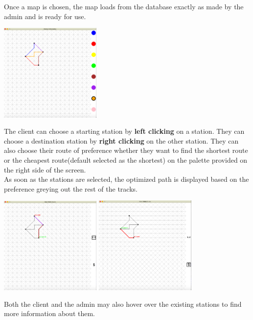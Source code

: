 \documentclass[fontsize=11pt]{article}
\begin{document}
    Once a map is chosen, the map loads from the database exactly as made by the admin and is ready for use.\\
    \begin{center}
        \includegraphics[width = 5cm]{Sample Map.png}\\
    \end{center}
    The client can choose a starting station by \textbf{left clicking} on a station. They can choose a destination station by \textbf{right clicking} on the other station. They can also choose their route of preference whether they want to find the shortest route or the cheapest route(default selected as the shortest) on the palette provided on the right side of the screen.\\
    As soon as the stations are selected, the optimized path is displayed based on the preference greying out the rest of the tracks.\\
    \begin{center}
        \includegraphics[width = 5cm]{client shortest route.png} \quad
        \includegraphics[width = 5cm]{client cheapest route.png}
    \end{center}
    Both the client and the admin may also hover over the existing stations to find more information about them.
\end{document}
